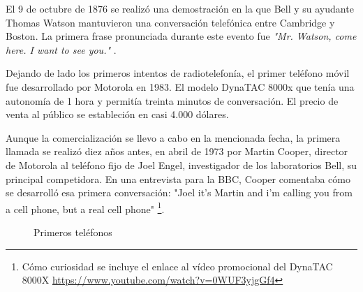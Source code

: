El 9 de octubre de 1876 se realizó una demostración en la que Bell y su ayudante Thomas Watson mantuvieron una conversación telefónica entre Cambridge y Boston. La primera frase pronunciada durante este evento fue \textit{"Mr. Watson, come here. I want to see you."} \cite{Even01}.

Dejando de lado los primeros intentos de radiotelefonía, el primer teléfono móvil fue desarrollado por Motorola en 1983. El modelo \ac{DynaTAC} 8000x que tenía una autonomía de 1 hora y permitía treinta minutos de conversación. El precio de venta al público se estableción en casi 4.000 dólares.

Aunque la comercialización se llevo a cabo en la  mencionada fecha, la primera llamada se realizó diez años antes, en abril de 1973 por Martin Cooper, director de Motorola al teléfono fijo de Joel Engel, investigador de los laboratorios Bell, su principal competidora. En una entrevista para la BBC, Cooper comentaba cómo se desarrolló esa primera conversación: "Joel it's Martin and i'm calling you from a cell phone, but a real cell phone" \cite{BBC13}\footnote{Cómo curiosidad se incluye el enlace al vídeo promocional del DynaTAC 8000X \url{https://www.youtube.com/watch?v=0WUF3yjgGf4}}.

\begin{figure}[h!btp]
	\begin{adjustbox}{minipage=\linewidth, fbox}
		\centering
		\hspace{10mm}
	\end{adjustbox}
\caption{Primeros teléfonos}
	\label{fig:primeros-telefonos2}
\end{figure}

